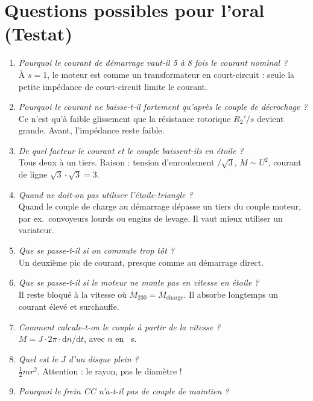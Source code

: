 \documentclass[11pt,a4paper]{article}
\begin{document}
\section{Questions possibles pour l'oral (Testat)}
\begin{enumerate}[label=\textbf{Q\arabic*:},leftmargin=2.2em]
\item \emph{Pourquoi le courant de démarrage vaut-il 5 à 8 fois le courant nominal ?}\\
  À $s=1$, le moteur est comme un transformateur en court-circuit : seule la petite impédance
  de court-circuit limite le courant.
\item \emph{Pourquoi le courant ne baisse-t-il fortement qu'après le couple de décrochage ?}\\
  Ce n'est qu'à faible glissement que la résistance rotorique $R_2'/s$ devient grande. Avant,
  l'impédance reste faible.
\item \emph{De quel facteur le courant et le couple baissent-ils en étoile ?}\\
  Tous deux à un tiers. Raison : tension d'enroulement $/\sqrt3$, $M\sim U^2$, courant de
  ligne $\sqrt3\cdot\sqrt3 = 3$.
\item \emph{Quand ne doit-on pas utiliser l'étoile-triangle ?}\\
  Quand le couple de charge au démarrage dépasse un tiers du couple moteur, par ex.\ convoyeurs
  lourds ou engins de levage. Il vaut mieux utiliser un variateur.
\item \emph{Que se passe-t-il si on commute trop tôt ?}\\
  Un deuxième pic de courant, presque comme au démarrage direct.
\item \emph{Que se passe-t-il si le moteur ne monte pas en vitesse en étoile ?}\\
  Il reste bloqué à la vitesse où $M_{230} = M_\mathrm{charge}$. Il absorbe longtemps un
  courant élevé et surchauffe.
\item \emph{Comment calcule-t-on le couple à partir de la vitesse ?}\\
  $M = J\cdot2\pi\cdot\mathrm dn/\mathrm dt$, avec $n$ en \si{\per\second}.
\item \emph{Quel est le $J$ d'un disque plein ?}\\
  $\frac12 m r^2$. Attention : le rayon, pas le diamètre !
\item \emph{Pourquoi le frein CC n'a-t-il pas de couple de maintien ?}\\

\end{enumerate}
\end{document}
